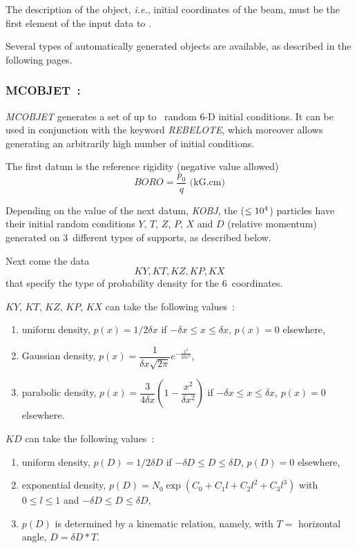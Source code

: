 The description of the object, \emph{i.e.}, initial coordinates of the 
beam, must be the first element of the input data to \zgou. 
 \bigskip

\noindent Several types of automatically generated objects are available, 
as described in the following pages.

\newpage

\subsubsection*{MCOBJET~:  \MCOBJETTitl} \label{MCOBJET} 

\noindent \textsl{MCOBJET} generates a set of up to \imax\ random 6-D initial
conditions. It can be used in conjunction with the keyword \textsl{REBELOTE},
which  moreover allows generating an arbitrarily high number of initial conditions. 
 \bigskip

\noindent The first datum is the reference rigidity (negative value 
allowed)
$$ BORO = \dfrac{p_0 }{ q} \text{ (kG.cm)} $$

\noindent Depending on the value of the next datum, \textsl{KOBJ}, the 
\IMAX{} ($\leq 10^4$) particles have their initial random 
conditions $ Y$, $T$, $Z$, $P$, $X$ and $ D $ (relative momentum)  generated 
on 3~different types of supports, as described below. 

\noindent Next come the data
$$KY, KT, KZ, KP, KX$$  %
that specify the type of probability density for the 6~coordinates. 

\noindent $KY$, $KT$, $KZ$, $KP$, $KX$ can take the following values~:
\begin{enumerate}
\item uniform density, $p(x) =1/2\delta x$ if  $-\delta x \leq x \leq \delta x$, $p(x) = 0$ elsewhere,
\item Gaussian density, $p(x) = \dfrac{1}{\delta x \sqrt{2\pi}} 
	e^{- \frac{x^2}{2 \delta x^2}}$,
\item parabolic density, $p(x) = \dfrac{3}{4 \delta x} 
	(1- \dfrac{x^2}{\delta x^2})$ if $-\delta x \leq x \leq \delta x$, $p(x) = 0$ elsewhere.
\end{enumerate}

\noindent $KD$ can take the following values~:
\begin{enumerate}
\item uniform density, $p(D) =1/2\delta \! D$ if  $-\delta \! D \leq D \leq \delta \! D$, $p(D) = 0$ elsewhere,
\item exponential density, $p(D) = N_0 \exp (C_0 + C_1 l + C_2 l^2 + C_3 l^3)$
	with $0 \leq l \leq 1$ and $-\delta D \leq D \leq \delta D$,
\item $p(D)$ is determined by a kinematic relation, namely, with $T=$ 
horizontal angle, $D= \delta D \ast T$.
\end{enumerate}

